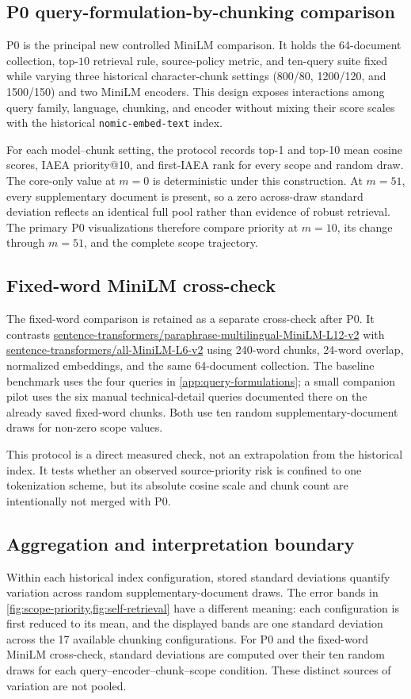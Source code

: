 \subsection{P0 query-formulation-by-chunking comparison}
P0 is the principal new controlled MiniLM comparison. It holds the 64-document collection, top-$10$ retrieval rule, source-policy metric, and ten-query suite fixed while varying three historical character-chunk settings (800/80, 1200/120, and 1500/150) and two MiniLM encoders. This design exposes interactions among query family, language, chunking, and encoder without mixing their score scales with the historical \texttt{nomic-embed-text} index.

For each model--chunk setting, the protocol records top-1 and top-10 mean cosine scores, IAEA priority@10, and first-IAEA rank for every scope and random draw. The core-only value at $m=0$ is deterministic under this construction. At $m=51$, every supplementary document is present, so a zero across-draw standard deviation reflects an identical full pool rather than evidence of robust retrieval. The primary P0 visualizations therefore compare priority at $m=10$, its change through $m=51$, and the complete scope trajectory.

\subsection{Fixed-word MiniLM cross-check}
The fixed-word comparison is retained as a separate cross-check after P0. It contrasts \url{sentence-transformers/paraphrase-multilingual-MiniLM-L12-v2} with \url{sentence-transformers/all-MiniLM-L6-v2} using 240-word chunks, 24-word overlap, normalized embeddings, and the same 64-document collection. The baseline benchmark uses the four queries in \cref{app:query-formulations}; a small companion pilot uses the six manual technical-detail queries documented there on the already saved fixed-word chunks. Both use ten random supplementary-document draws for non-zero scope values.

This protocol is a direct measured check, not an extrapolation from the historical index. It tests whether an observed source-priority risk is confined to one tokenization scheme, but its absolute cosine scale and chunk count are intentionally not merged with P0.

\subsection{Aggregation and interpretation boundary}
Within each historical index configuration, stored standard deviations quantify variation across random supplementary-document draws. The error bands in \cref{fig:scope-priority,fig:self-retrieval} have a different meaning: each configuration is first reduced to its mean, and the displayed bands are one standard deviation across the 17 available chunking configurations. For P0 and the fixed-word MiniLM cross-check, standard deviations are computed over their ten random draws for each query--encoder--chunk--scope condition. These distinct sources of variation are not pooled.

